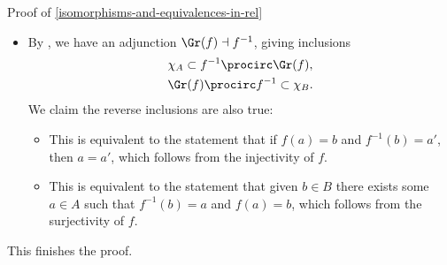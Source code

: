 \begin{Proof}{Proof of \cref{isomorphisms-and-equivalences-in-rel}}
\begin{itemize}
        \item{}By , we have an adjunction $\Gr(f)\dashv f^{-1}$, giving inclusions
            \begin{gather*}
                \chi_{A}              \subset f^{-1}\procirc\Gr(f),\\
                \Gr(f)\procirc f^{-1} \subset \chi_{B}.
            \end{gather*}
            We claim the reverse inclusions are also true:
            \begin{itemize}%
                \item{}This is equivalent to the statement that if $f(a)=b$ and $f^{-1}(b)=a'$, then $a=a'$, which follows from the injectivity of $f$.
                \item{}This is equivalent to the statement that given $b\in B$ there exists some $a\in A$ such that $f^{-1}(b)=a$ and $f(a)=b$, which follows from the surjectivity of $f$.
            \end{itemize}%
    \end{itemize}%
    This finishes the proof.
\end{Proof}
